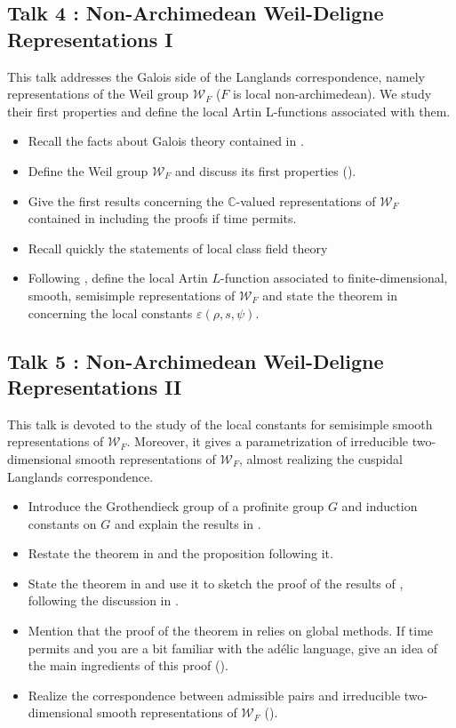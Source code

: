 \documentclass[11pt]{amsart}
\newcommand{\C}{\mathbb{C}}
\begin{document}
\subsection{Talk 4 : Non-Archimedean Weil-Deligne Representations I}
This talk addresses the Galois side of the Langlands correspondence, namely representations
of the Weil group $\mathcal{W}_F$ ($F$ is local non-archimedean). We study their first properties and define the local Artin L-functions
associated with them.
\begin{itemize}
    \item Recall the facts about Galois theory contained in \cite[\S 28.1-28.3]{BH06}.
    \item Define the Weil group $\mathcal{W}_F$ and discuss its first properties (\cite[\S 28.4-28.5]{BH06}).
    \item Give the first results concerning the $\C$-valued representations of $\mathcal{W}_F$ contained in \cite[\S 28.6-28.7]{BH06} including the proofs if time permits.
    \item Recall quickly the statements of local class field theory \cite[\S 29.1]{BH06}
    \item Following \cite[\S 29.2-29.4]{BH06}, define the local Artin $L$-function associated to finite-dimensional, smooth, semisimple representations of $\mathcal{W}_F$ and state the theorem in \cite[\S 29.4]{BH06} concerning the local constants $\varepsilon(\rho,s,\psi)$.
\end{itemize}



\subsection{Talk 5 : Non-Archimedean Weil-Deligne Representations II}

This talk is devoted to the study of the local constants for semisimple smooth representations of
$\mathcal{W}_F$. Moreover, it gives a parametrization of irreducible two-dimensional smooth representations
of $\mathcal{W}_F$, almost realizing the cuspidal Langlands correspondence.
\begin{itemize}
    \item Introduce the Grothendieck group of a profinite group $G$ and induction constants on $G$
    and explain the results in \cite[\S 30.1]{BH06}.
    \item Restate the theorem in \cite[\S 29.4]{BH06} and the proposition following it.
    \item State the theorem in \cite[\S 30.2]{BH06} and use it to sketch the proof of the results of \cite[\S 29.4]{BH06},
    following the discussion in \cite[\S 30.3-30.6]{BH06}.
    \item Mention that the proof of the theorem in \cite[\S 30.2]{BH06} relies on global methods. If time permits and you are a bit familiar with the adélic language, give an idea of the main ingredients of this proof (\cite[\S 30.7-30.9]{BH06}).
    \item Realize the correspondence between admissible pairs and irreducible two-dimensional smooth representations of $\mathcal{W}_F$ (\cite[\S 34.1]{BH06}).
\end{itemize} 
\end{document}
